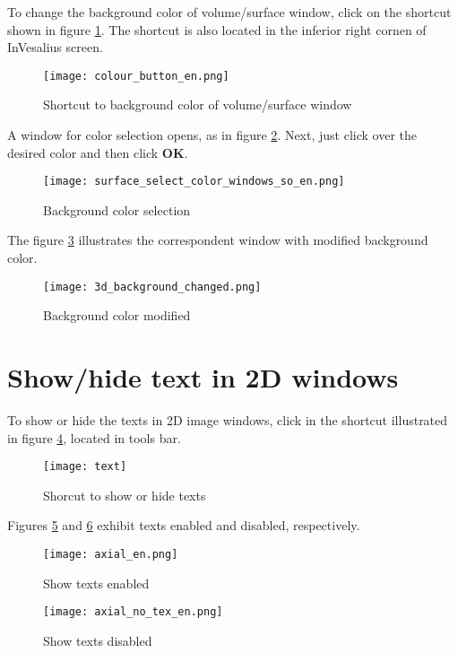 To change the background color of volume/surface window, click on the shortcut shown in figure
\ref{fig:button_select_color_2}. The shortcut is also located in the inferior right cornen of InVesalius screen.

\begin{figure}[!htb]
\centering
\texttt{[image: colour\_button\_en.png]}
\caption{Shortcut to background color of volume/surface window}
\label{fig:button_select_color_2}
\end{figure}

A window for color selection opens, as in figure \ref{fig:color_window_background}.
Next, just click over the desired color and then click \textbf{OK}.

\begin{figure}[!htb]
\centering
\texttt{[image: surface\_select\_color\_windows\_so\_en.png]}
\caption{Background color selection}
\label{fig:color_window_background}
\end{figure}

The figure \ref{fig:background_color} illustrates the correspondent window with modified background color.

\begin{figure}[!htb]
\centering
\texttt{[image: 3d\_background\_changed.png]}
\caption{Background color modified}
\label{fig:background_color}
\end{figure}

\newpage

\section{Show/hide text in 2D windows}

To show or hide the texts in 2D image windows, click in the shortcut illustrated
in figure \ref{fig:text}, located in tools bar.

\begin{figure}[!htb]
\centering
\texttt{[image: text]}
\caption{Shorcut to show or hide texts}
\label{fig:text}
\end{figure}

Figures \ref{fig:text_on} and \ref{fig:text_off} exhibit texts enabled and disabled, respectively.

\begin{figure}[!htb]
\centering
\texttt{[image: axial\_en.png]}
\caption{Show texts enabled}
\label{fig:text_on}
\end{figure}

\begin{figure}[!htb]
\centering
\texttt{[image: axial\_no\_tex\_en.png]}
\caption{Show texts disabled}
\label{fig:text_off}
\end{figure}

